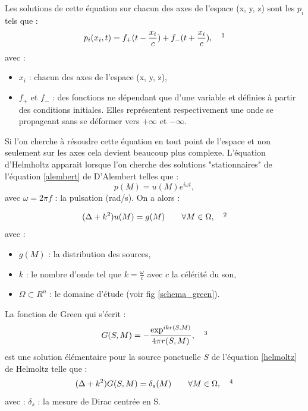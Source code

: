 Les solutions de cette équation sur chacun des axes de l'espace (x, y, z) sont les $p_i$ tels que :
\begin{equation}
p_i(x_i,t) = f_+(t-\frac{x_i}{c}) + f_-(t+\frac{x_i}{c}),
\ \ \ \footnotemark
\end{equation}
avec :
\begin{itemize}
\item $x_i$ : chacun des axes de l'espace (x, y, z),
\item $ f_+$ et  $f_-$ : des fonctions ne dépendant que d'une variable et définies à partir des conditions initiales. Elles représentent respectivement une onde se propageant sans se déformer vers $+\infty$ et $-\infty$.
\end{itemize}
Si l'on cherche à résoudre cette équation en tout point de l'espace et non seulement sur les axes cela devient beaucoup plus complexe.
L'équation d'Helmholtz apparait lorsque l'on cherche des solutions "stationnaires" de l'équation \ref{alembert} de D'Alembert telles que :
\begin{equation}
p(M) = u(M)e^{i\omega t},
\end{equation}
avec  $\omega = 2\pi f$ : la pulsation (rad/s). On a alors :

\begin{equation} \label{helmoltz}
(\Delta + k^2)u(M) = g(M)	 	\qquad  \forall M  \in \Omega,
\ \ \ \footnotemark
\end{equation}
avec :
\begin{itemize}
\item $g(M)$ : la distribution des sources,
\item $k$ : le nombre d'onde tel que $k = \frac{\omega}{c}$ avec $c$ la célérité du son,
\item $\Omega  \subset R^n$ : le domaine d'étude (voir fig \ref{schema_green}).
\end{itemize}
%
La fonction de Green qui s'écrit :
%
\begin{equation}
G(S,M) = -\frac{\exp^{ikr(S,M)}}{4\pi r(S,M)},
\ \ \ \footnotemark
\end{equation}
%
est une solution élémentaire pour la source ponctuelle $S$ de l'équation \ref{helmoltz} de Helmoltz telle que :
\begin{equation} \label{green}
(\Delta + k^2)G(S,M) = \delta_s(M)	 	\qquad  \forall M  \in \Omega,
\ \ \ \footnotemark
\end{equation}
avec : $\delta_s$ : la mesure de \gls{Dirac} centrée en S.

